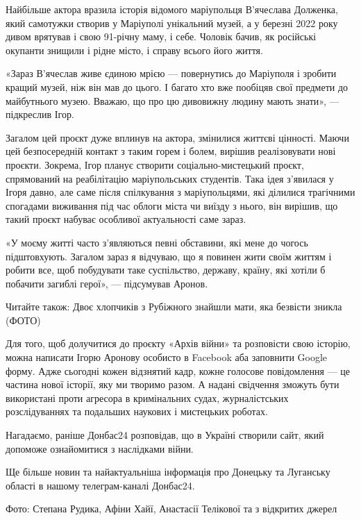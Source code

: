 Найбільше актора вразила історія відомого маріупольця В'ячеслава Долженка, який
самотужки створив у Маріуполі унікальний музей, а у березні 2022 року дивом
врятував і свою 91-річну маму, і себе. Чоловік бачив, як російські окупанти
знищили і рідне місто, і справу всього його життя.

«Зараз В'ячеслав живе єдиною мрією — повернутись до Маріуполя і зробити кращий
музей, ніж він мав до цього. І багато хто вже пообіцяв свої предмети до
майбутнього музею. Вважаю, що про цю дивовижну людину мають знати», —
підкреслив Ігор.

Загалом цей проєкт дуже вплинув на актора, змінилися життєві цінності. Маючи
цей безпосередній контакт з таким горем і болем, вирішив реалізовувати нові
проєкти. Зокрема, Ігор планує створити соціально-мистецький проєкт, спрямований
на реабілітацію маріупольських студентів. Така ідея з'явилася у Ігоря давно,
але саме після спілкування з маріупольцями, які ділилися трагічними спогадами
виживання під час облоги міста чи виїзду з нього, він вирішив, що такий проєкт
набуває особливої актуальності саме зараз.

«У моєму житті часто з'являються певні обставини, які мене до чогось
підштовхують. Загалом зараз я відчуваю, що я повинен жити своїм життям і робити
все, щоб побудувати таке суспільство, державу, країну, які хотіли б побачити
загиблі герої», — підсумував Аронов.

Читайте також: Двоє хлопчиків з Рубіжного знайшли мати, яка безвісти зникла
(ФОТО)

Для того, щоб долучитися до проєкту «Архів війни» та розповісти свою історію,
можна написати Ігорю Аронову особисто в Facebook аба заповнити Google форму.
Адже сьогодні кожен відзнятий кадр, кожне голосове повідомлення — це частина
нової історії, яку ми творимо разом. А надані свідчення зможуть бути
використані проти агресора в кримінальних судах, журналістських розслідуваннях
та подальших наукових і мистецьких роботах.

Нагадаємо, раніше Донбас24 розповідав, що в Україні створили сайт, який
допоможе ознайомитися з наслідками війни.

Ще більше новин та найактуальніша інформація про Донецьку та Луганську області
в нашому телеграм-каналі Донбас24.

Фото: Степана Рудика, Афіни Хайї, Анастасії Телікової та з відкритих джерел
